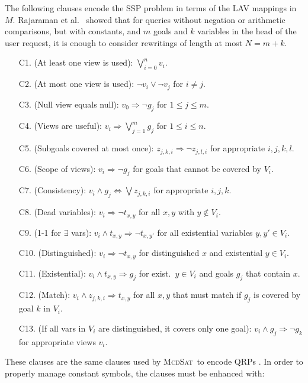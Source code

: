 \documentclass{llncs}
\newcommand{\mcdsat}{\textsc{McdSat}}
\begin{document}
{The following clauses encode the SSP problem in terms of the LAV mappings in $M$.
Rajaraman et al.\ \cite{RajaramanSU95} showed that for queries without negation or
arithmetic comparisons, but with constants, and $m$ goals and $k$ variables in the
head of the user request, it is enough to consider rewritings of length at most $N=m+k$.
\begin{enumerate}[C10.]
\item[C1.] (At least one view is used): $\bigvee_{i=0}^n v_i$.
\item[C2.] (At most one view is used): $\neg v_i\lor\neg v_j$ for $i\neq j$.
\item[C3.] (Null view equals null): $v_0 \Rightarrow \neg g_j$ for $1\leq j\leq m$.
\item[C4.] (Views are useful): $v_i \Rightarrow \bigvee_{j=1}^m g_j$ for $1\leq i\leq n$.
\item[C5.] (Subgoals covered at most once): $z_{j,k,i} \Rightarrow \neg z_{j,l,i}$ for appropriate $i,j,k,l$.
\item[C6.] (Scope of views): $v_i \Rightarrow \neg g_j$ for goals that cannot be covered by $V_i$.
\item[C7.] (Consistency): $v_i \land g_j \Leftrightarrow \bigvee z_{j,k,i}$ for appropriate $i,j,k$.
\item[C8.] (Dead variables): $v_i \Rightarrow \neg t_{x,y}$ for all $x,y$ with $y\notin V_i$.
\item[C9.] (1-1 for $\exists$ vars): $v_i \land t_{x,y} \Rightarrow \neg t_{x,y'}$ for all
           existential variables $y,y'\in V_i$.
\item[C10.] (Distinguished): $v_i \Rightarrow \neg t_{x,y}$ for distinguished $x$ and existential
            $y\in V_i$.
\item[C11.] (Existential): $v_i\land t_{x,y}\Rightarrow g_j$ for exist.\ $y\in V_i$ and
            goals $g_j$ that contain $x$.
\item[C12.] (Match): $v_i\land z_{j,k,i} \Rightarrow t_{x,y}$ for all $x,y$ that must match
            if $g_j$ is covered by goal $k$ in $V_i$.
\item[C13.] (If all vars in $V_i$ are distinguished, it covers only one goal):
            $v_i \land g_j \Rightarrow \neg g_k$ for appropriate views $v_i$.
\end{enumerate}
These clauses are the same clauses used by \mcdsat\ to encode QRPs \cite{arvelo:aaai06}.
In order to properly manage constant symbols, the clauses must be enhanced with:
\begin{enumerate}[C10.]

\end{enumerate}}
\end{document}
